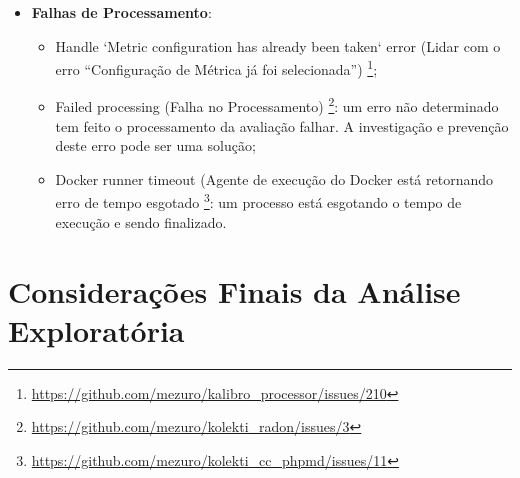 \begin{itemize}
\begin{itemize}
      \item Multiple calls to process trigger multiple redundant periodic
      processings (Chamadas excessivas para o gatilho de processo com muitos
      períodos de processamento redundante)
      \footnote{\url{https://github.com/mezuro/kalibro\_processor/issues/208}}:
        muitas chamadas para os métodos de processamento estão sendo feitas, o
        que gera muitos processos e muito desperdício de tempo.

        Uma solução é a separação de diferentes filas de requisições para
        diferentes eventos.

      \item Separate processings in multiple queues (Processos separados por
      várias filas)
      \footnote{\url{https://github.com/mezuro/kalibro\_processor/issues/209}}:
        A sugestão é a separação de três filas de requisição de processamento,
        com prioridades distintas. Maior para novos repositórios avaliados,
        baixa prioridade para os reprocessamentos e o isolamento dos
        processamentos periódicos

    \end{itemize}
  \item \textbf{Falhas de Processamento}:
    \begin{itemize}
      \item Handle `Metric configuration has already been taken` error (Lidar
      com o erro ``Configuração de Métrica já foi selecionada'')
      \footnote{\url{https://github.com/mezuro/kalibro\_processor/issues/210}};

      \item Failed processing (Falha no Processamento)
      \footnote{\url{https://github.com/mezuro/kolekti\_radon/issues/3}}:
        um erro não determinado tem feito o processamento da avaliação falhar.
        A investigação e prevenção deste erro pode ser uma solução;

      \item Docker runner timeout (Agente de execução do Docker está retornando
      erro de tempo esgotado
      \footnote{\url{https://github.com/mezuro/kolekti\_cc\_phpmd/issues/11}}:
        um processo está esgotando o tempo de execução e sendo finalizado.
    \end{itemize}
\end{itemize}

\newpage

\section{Considerações Finais da Análise Exploratória}

